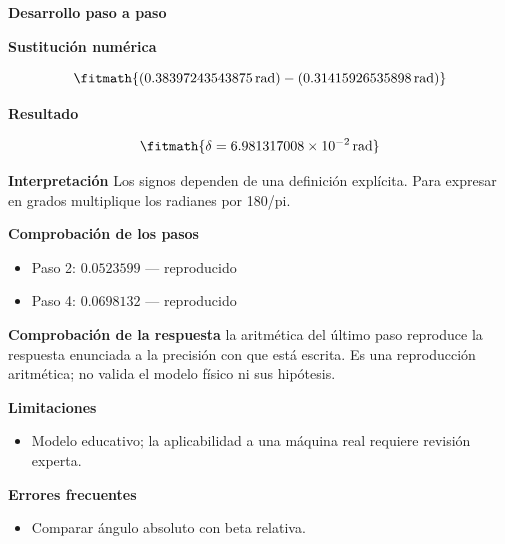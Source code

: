 \documentclass[10pt,openany]{book}
\begin{document}
\begin{tcolorbox}[title={Problema resuelto 4}, studiumworked, breakable]
\noindent\textbf{Desarrollo paso a paso}



\noindent\textbf{Sustitución numérica}

\[
\fitmath{\left(0.38397243543875\,\mathrm{rad}\right) - \left(0.31415926535898\,\mathrm{rad}\right)}
\]

\noindent\textbf{Resultado}

\[
\fitmath{\delta=6.981317008\times10^{-2}\,\mathrm{rad}}
\]

\noindent\textbf{Interpretación}
Los signos dependen de una definición explícita. Para expresar en grados multiplique los radianes por 180/pi.

\noindent\textbf{Comprobación de los pasos}
\begin{itemize}
\item Paso 2: $0.0523599$ — reproducido
\item Paso 4: $0.0698132$ — reproducido
\end{itemize}

\noindent\textbf{Comprobación de la respuesta} la aritmética del último paso reproduce la respuesta enunciada a la precisión con que está escrita. Es una reproducción aritmética; no valida el modelo físico ni sus hipótesis.

\noindent\textbf{Limitaciones}
\begin{itemize}
\item Modelo educativo; la aplicabilidad a una máquina real requiere revisión experta.
\end{itemize}

\noindent\textbf{Errores frecuentes}
\begin{itemize}
\item Comparar ángulo absoluto con beta relativa.
\end{itemize}
\end{tcolorbox}
\end{document}
